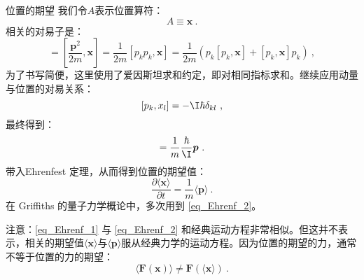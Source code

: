 \begin{example}{位置的期望}
我们令$A$表示位置算符：
\begin{equation}
A \equiv \boldsymbol{x}~.
\end{equation}
相关的对易子是：
\begin{equation}
[H, \boldsymbol{x}]=\left[\frac{\boldsymbol{p}^2}{2 m}, \boldsymbol{x}\right]=\frac{1}{2 m}\left[p_k p_k, \boldsymbol{x}\right]=\frac{1}{2 m}\left(p_k\left[p_k, \boldsymbol{x}\right]+\left[p_k, \boldsymbol{x}\right] p_k\right)~,
\end{equation}
为了书写简便，这里使用了爱因斯坦求和约定，即对相同指标求和。继续应用动量与位置的对易关系：
\begin{equation}
\left[p_k, x_l\right]=-\I \hbar \delta_{k l}~,
\end{equation}
最终得到：
\begin{equation}
[H, \boldsymbol{x}]=\frac{1}{m} \frac{\hbar}{\I} \boldsymbol{p}~.
\end{equation}
带入Ehrenfest 定理，从而得到位置的期望值：
\begin{equation}\label{eq_Ehrenf_2}
\frac{\partial\langle\boldsymbol{x}\rangle}{\partial t}=\frac{1}{m}\langle\boldsymbol{p}\rangle ~.
\end{equation}
在 Griffiths 的量子力学概论\cite{GriffQ}中，多次用到 \autoref{eq_Ehrenf_2}。
\end{example}

注意：\autoref{eq_Ehrenf_1} 与 \autoref{eq_Ehrenf_2} 和经典运动方程非常相似。但这并不表示，相关的期望值$\langle\boldsymbol{x}\rangle$与$\langle\boldsymbol{p}\rangle$服从经典力学的运动方程。因为位置的期望的力，通常不等于位置的力的期望：
\begin{equation}
\langle\boldsymbol{F}(\boldsymbol{x})\rangle \ne \boldsymbol{F}(\langle\boldsymbol{x}\rangle)~.
\end{equation}